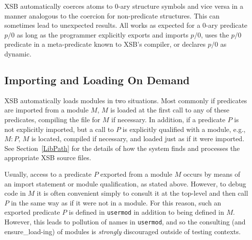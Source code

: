 XSB automatically coerces atoms to 0-ary structure symbols and vice
versa in a manner analogous to the coercion for non-predicate
structures.
This can sometimes lead to unexpected results.  All works as expected
for a 0-ary predicate $p/0$ as long as the programmer explicitly
exports and imports $p/0$, uses the $p/0$ predicate in a
meta-predicate known to XSB's compiler, or declares $p/0$ as dynamic.

\subsection{Importing and Loading On Demand} 

XSB automatically loads modules in two situations.  Most commonly if
predicates are imported from a module $M$, $M$ is loaded at the first
call to any of these predicates, compiling the file for $M$ if
necessary.  In addition, if a predicate $P$ is not explicitly
imported, but a call to $P$ is explicitly qualified with a module,
e.g., $M:P$, $M$ is located, compiled if necessary, and loaded just as
if it were imported.  See Section~\ref{LibPath} for the details of how
the system finds and processes the appropriate XSB source files.

Usually, access to a predicate $P$ exported from a module $M$ occurs
by means of an import statement or module qualification, as stated
above.  However, to debug code in $M$ it is often convenient simply to
consult it at the top-level and then call $P$ in the same way as if it
were not in a module.
For this reason, such an exported predicate $P$ is defined in
{\tt usermod} in addition to being defined in $M$.  
However, this leads to pollution of names in {\tt usermod}, and so the
consulting (and ensure\_load-ing) of modules is {\em strongly}
discouraged outside of testing contexts.


